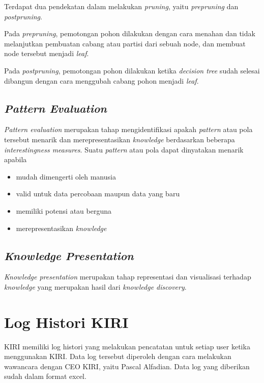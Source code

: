 Terdapat dua pendekatan dalam melakukan \textsl{pruning}, yaitu \textsl{prepruning} dan \textsl{postpruning}.

Pada \textsl{prepruning}, pemotongan pohon dilakukan dengan cara menahan dan tidak melanjutkan pembuatan cabang atau partisi dari sebuah node, dan membuat node tersebut menjadi \textsl{leaf}. 

Pada \textsl{postpruning}, pemotongan pohon dilakukan ketika \textsl{decision tree} sudah selesai dibangun dengan cara menggubah cabang pohon menjadi \textsl{leaf}.

\subsection{\textsl{Pattern Evaluation}}
\textsl{Pattern evaluation} merupakan tahap mengidentifikasi apakah \textsl{pattern} atau pola tersebut menarik dan merepresentasikan \textsl{knowledge} berdasarkan beberapa \textsl{interestingness measures}.
Suatu \textsl{pattern} atau pola dapat dinyatakan menarik apabila
\begin{itemize}
	\item mudah dimengerti oleh manusia
	\item valid untuk data percobaan maupun data yang baru
	\item memiliki potensi atau berguna
	\item merepresentasikan \textsl{knowledge}
\end{itemize}

\subsection{\textsl{Knowledge Presentation}}
\textsl{Knowledge presentation} merupakan tahap representasi dan visualisasi terhadap \textsl{knowledge} yang merupakan hasil dari \textsl{knowledge discovery}.	

\section{Log Histori KIRI}

KIRI memiliki log histori yang melakukan pencatatan untuk setiap user ketika menggunakan KIRI. Data log tersebut diperoleh dengan cara melakukan wawancara dengan CEO KIRI, yaitu Pascal Alfadian. Data log yang diberikan sudah dalam format excel.

